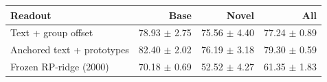 \begin{tabular}{lrrr}
\toprule
Readout & Base & Novel & All \\
\midrule
Text + group offset & 78.93 $\pm$ 2.75 & 75.56 $\pm$ 4.40 & 77.24 $\pm$ 0.89 \\
Anchored text + prototypes & 82.40 $\pm$ 2.02 & 76.19 $\pm$ 3.18 & 79.30 $\pm$ 0.59 \\
Frozen RP-ridge (2000) & 70.18 $\pm$ 0.69 & 52.52 $\pm$ 4.27 & 61.35 $\pm$ 1.83 \\
\bottomrule
\end{tabular}